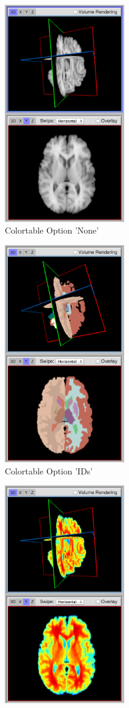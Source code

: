 \documentclass[a4paper,11pt,titlepage]{article}
\begin{document}
\begin{figure}
\centering
\begin{subfigure}{.33\textwidth}
  \centering
  \includegraphics[width=52mm]{graphics/ColortableB_02.png}
  \caption{Colortable Option 'None'}
\end{subfigure}%
\begin{subfigure}{.33\textwidth}
  \centering
  \includegraphics[width=52mm]{graphics/ColortableB_01.png}
  \caption{Colortable Option 'IDs'}
\end{subfigure}
\begin{subfigure}{.33\textwidth}
  \centering
  \includegraphics[width=52mm]{graphics/ColortableB_03.png}

\end{subfigure}
\end{figure}
\end{document}
